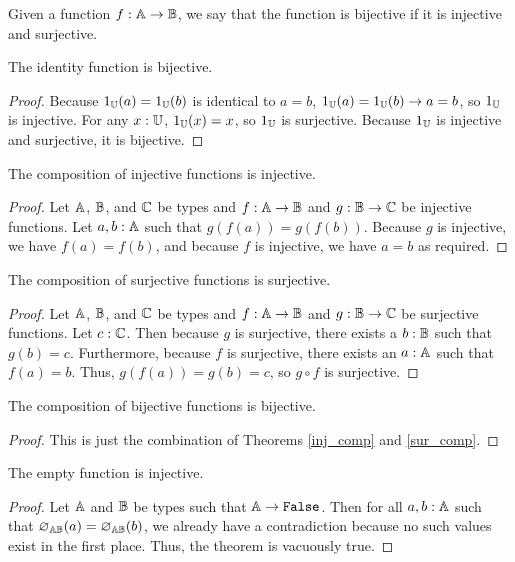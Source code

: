 \documentclass[../../math.tex]{subfiles}
\begin{document}
\begin{class}
    Given a function $f : \mathbb{A} \rightarrow \mathbb{B}$, we say that the function is
    bijective if it is injective and surjective.
\end{class}

\begin{instance}
    The identity function is bijective.
\end{instance}
\begin{proof}
    Because $1_{\mathbb{U}}(a) = 1_{\mathbb{U}}(b)$ is identical to $a = b$, $1_{\mathbb{U}}(a) = 1_{\mathbb{U}}(b)
    \rightarrow a = b$, so $1_{\mathbb{U}}$ is injective.  For any $x : \mathbb{U}$, $1_{\mathbb{U}}(x) =
    x$, so $1_{\mathbb{U}}$ is surjective.  Because $1_{\mathbb{U}}$ is injective and surjective, it
    is bijective.
\end{proof}

\begin{instance} \label{inj_comp}
    The composition of injective functions is injective.
\end{instance}
\begin{proof}
    Let $\mathbb{A}$, $\mathbb{B}$, and $\mathbb{C}$ be types and $f : \mathbb{A} \rightarrow \mathbb{B}$ and $g : \mathbb{B}
    \rightarrow \mathbb{C}$ be injective functions.  Let $a, b : \mathbb{A}$ such that $g(f(a))
    = g(f(b))$.  Because $g$ is injective, we have $f(a) = f(b)$, and because
    $f$ is injective, we have $a = b$ as required.
\end{proof}

\begin{instance} \label{sur_comp}
    The composition of surjective functions is surjective.
\end{instance}
\begin{proof}
    Let $\mathbb{A}$, $\mathbb{B}$, and $\mathbb{C}$ be types and $f : \mathbb{A} \rightarrow \mathbb{B}$ and $g : \mathbb{B}
    \rightarrow \mathbb{C}$ be surjective functions.  Let $c : \mathbb{C}$.  Then because $g$ is
    surjective, there exists a $b : \mathbb{B}$ such that $g(b) = c$.  Furthermore,
    because $f$ is surjective, there exists an $a : \mathbb{A}$ such that $f(a) = b$.
    Thus, $g(f(a)) = g(b) = c$, so $g \circ f$ is surjective.
\end{proof}

\begin{instance} \label{bij_comp}
    The composition of bijective functions is bijective.
\end{instance}
\begin{proof}
    This is just the combination of Theorems \ref{inj_comp} and \ref{sur_comp}.
\end{proof}

\begin{instance} \label{empty_inj}
    The empty function is injective.
\end{instance}
\begin{proof}
    Let $\mathbb{A}$ and $\mathbb{B}$ be types such that $\A \rightarrow \vtt{False}$.  Then for
    all $a, b : \mathbb{A}$ such that $\varnothing_{\mathbb{A}\mathbb{B}}(a) = \varnothing_{\mathbb{A}\mathbb{B}}(b)$,
    we already have a contradiction because no such values exist in the first
    place.  Thus, the theorem is vacuously true.
\end{proof}
\end{document}
